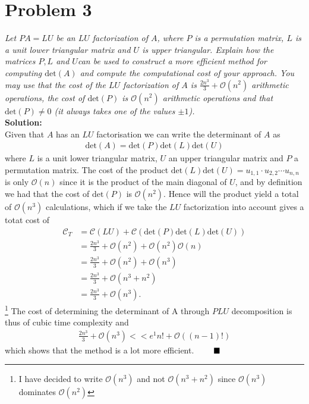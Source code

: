 \documentclass[12pt,
               a4paper,
               article,
               oneside,
               norsk,oldfontcommands]{memoir}
\newcommand{\Q}{ \qquad \hfill \blacksquare}
\newcommand{\spaze}{\vspace{4mm}\\}
\begin{document}
\section*{\centering Problem 3}
\emph{Let $PA = LU$ be an $LU$ factorization of $A$, where $P$ is a permutation matrix, $L$ is a unit lower triangular matrix and $U$ is upper triangular. Explain how the matrices $P, L$ and $U $can be used to construct a more efficient method for computing $\text{det}(A)$ and compute the computational cost of your approach. You may use that the cost of the $LU$ factorization of $A$ is $\frac{2n^3}{3} + \mathcal{O}(n^2)$ arithmetic operations, the cost of $\text{det}(P )$ is $\mathcal{O}(n^2)$ arithmetic operations and that $\text{det}(P)  \neq 0$ (it always takes one of the values $\pm 1$).} \spaze 
\textbf{Solution:} \spaze 
Given that $A$ has an $LU$ factorisation we can write the determinant of $A$ as 
\begin{align*}
\text{det}(A) = \text{det}(P)\text{det}(L) \text{det}(U)  
\end{align*}
where $L$ is a unit lower triangular matrix, $U$ an upper triangular matrix and $P$ a permutation matrix. The cost of the product $\text{det}(L) \text{det}(U) = u_{1,1} \cdot u_{2,2} \cdots u_{n,n}$ is only $\mathcal{O}(n)$ since it is the product of the main diagonal of $U$, and by definition we had that the cost of $\text{det}(P)$ is $\mathcal{O}(n^2)$. Hence will the product yield a total of $\mathcal{O}(n^3)$ calculations, which if we take the $LU$ factorization into account gives a totat cost of
\begin{align*}
\mathcal{C}_{T} &= \mathcal{C}(LU) + \mathcal{C} (\text{det}(P)\text{det}(L) \text{det}(U) ) \\[5pt]
&= \frac{2n^3}{3} +\mathcal{O}(n^2) + \mathcal{O}(n^2) \mathcal{O}(n) \\[5pt]
&=  \frac{2n^3}{3} + \mathcal{O}(n^2) +  \mathcal{O}(n^3) \\[5pt]
&=  \frac{2n^3}{3} +  \mathcal{O}(n^3 + n^2) \\[5pt]
&=  \frac{2n^3}{3}+  \mathcal{O}(n^3).
\end{align*}\footnote{I have decided to write $\mathcal{O}(n^3)$ and not $\mathcal{O}(n^3 + n^2)$ since $\mathcal{O}(n^3)$ dominates $\mathcal{O}(n^2)$}
The cost of determining the determinant of A through $PLU$ decomposition is thus of cubic time complexity and 
\begin{align*}
 \frac{2n^3}{3}+  \mathcal{O}(n^3) << e^1 n! + \mathcal{O}((n-1)!)
\end{align*}
which shows that the method is a lot more efficient. $\Q$
\end{document}
